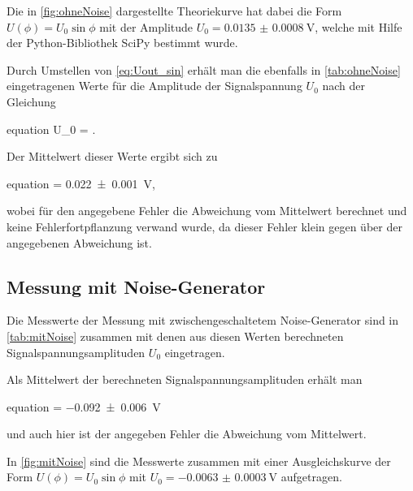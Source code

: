 	Die in \cref{fig:ohneNoise} dargestellte Theoriekurve hat dabei die Form $U(\phi) = U_{0} \sin{\phi}$ mit 
	der Amplitude $U_{0} = \SI{0.0135(8)}{\volt}$, welche mit Hilfe der Python-Bibliothek SciPy \cite{SciPy} bestimmt wurde.
	
	Durch Umstellen von \cref{eq:Uout_sin} erhält man die ebenfalls in \cref{tab:ohneNoise} eingetragenen Werte für die 
	Amplitude der Signalspannung $U_{0}$ nach der Gleichung
	\begin{empheq}{equation}
			U_{0} = .
			\label{eq:U0}
	\end{empheq}  
	Der Mittelwert dieser Werte ergibt sich zu 
	\begin{empheq}{equation}
			 = \SI{0.022(1)}{V},
			\label{eq:U0_mean}
	\end{empheq}  	
	wobei für den angegebene Fehler die Abweichung vom Mittelwert berechnet und keine Fehlerfortpflanzung verwand wurde, da dieser 
	Fehler klein gegen über der angegebenen Abweichung ist.
	 
\subsection{Messung mit Noise-Generator} \label{sec:mitNoise}
	Die Messwerte der Messung mit zwischengeschaltetem Noise-Generator sind in \cref{tab:mitNoise} zusammen mit denen aus diesen
	Werten berechneten Signalspannungsamplituden $U_{0}$ eingetragen.
	
	 
	
	Als Mittelwert der berechneten Signalspannungsamplituden erhält man
	\begin{empheq}{equation}
			 = \SI{-0.092(6)}{V}
			\label{eq:U0Noise_mean}
	\end{empheq}	
	und auch hier ist der angegeben Fehler die Abweichung vom Mittelwert.
	
	In \cref{fig:mitNoise} sind die Messwerte zusammen mit einer Ausgleichskurve der Form $U(\phi) = U_{0} \sin{\phi}$ mit 
	$U_{0} = \SI{-0.0063(3)}{\volt}$ aufgetragen.

